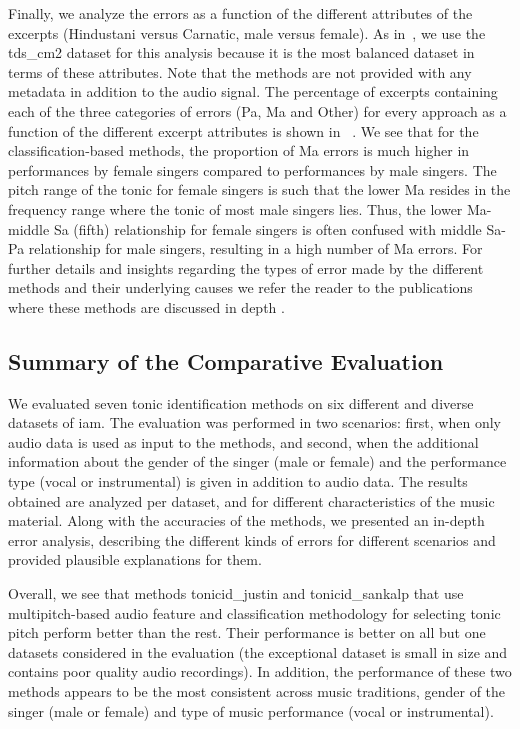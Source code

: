 {Finally, we analyze the errors as a function of the different attributes of the excerpts (Hindustani versus Carnatic, male versus female). As in~, we use the \acrshort{tds_cm2} dataset for this analysis because it is the most balanced dataset in terms of these attributes. Note that the methods are not provided with any metadata in addition to the audio signal. The percentage of excerpts containing each of the three categories of errors (Pa, Ma and Other) for every approach as a function of the different excerpt attributes is shown in ~. We see that for the classification-based methods, the proportion of Ma errors is much higher in performances by female singers compared to performances by male singers. The pitch range of the tonic for female singers is such that the lower Ma resides in the frequency range where the tonic of most male singers lies. Thus, the lower Ma-middle Sa (fifth) relationship for female singers is often confused with middle Sa-Pa relationship for male singers, resulting in a high number of Ma errors. For further details and insights regarding the types of error made by the
different methods and their underlying causes we refer the reader to the publications where these methods are discussed in depth \citep{salamon2012multipitch, SGulati_MThesis2012,bellur2012knowledge,ranjani2011carnatic}.


\subsection{Summary of the Comparative Evaluation }
\label{sec:pre_processing_tonic_identification_summary}

We evaluated seven tonic identification methods on six different and diverse datasets of \gls{iam}. The evaluation was performed in two scenarios: first, when only audio data is used as input to the methods, and second, when the additional information about the gender of the singer (male or female) and the performance type (vocal or instrumental) is given in addition to audio data. The results obtained are analyzed per dataset, and for different characteristics of the music material. Along with the accuracies of the methods, we presented an in-depth error analysis, describing the different kinds of errors for different scenarios and provided plausible explanations for them.

Overall, we see that methods \acrshort{tonicid_justin} and \acrshort{tonicid_sankalp} that use multipitch-based audio feature and classification methodology for selecting tonic pitch perform better than the rest. Their performance is better on all but one datasets considered in the evaluation (the exceptional dataset is small in size and contains poor quality audio recordings). In addition, the performance of these two methods appears to be the most consistent across music traditions, gender of the singer (male or female) and type of music performance (vocal or instrumental). 

}
